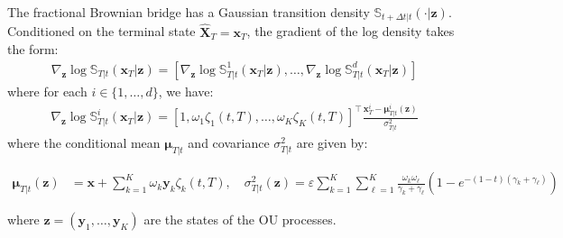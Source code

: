 \documentclass{article}
\begin{document}
\begin{lemma}\label{lemma:frac-gaus-bridge}
    The fractional Brownian bridge has a Gaussian transition density $\mathbb{S}_{t+\Delta t|t}(\cdot|\boldsymbol{z})$. Conditioned on the terminal state $\widehat{\boldsymbol{X}}_T=\boldsymbol{x}_T$, the gradient of the log density takes the form:
    \begin{align}
        \nabla_{\boldsymbol{z}}\log \mathbb{S}_{T|t}(\boldsymbol{x}_T|\boldsymbol{z})=\left[\nabla_{\boldsymbol{z}}\log \mathbb{S}^1_{T|t}(\boldsymbol{x}_T|\boldsymbol{z}), \dots, \nabla_{\boldsymbol{z}}\log \mathbb{S}^d_{T|t}(\boldsymbol{x}_T|\boldsymbol{z})\right]
    \end{align}
    where for each $i\in \{1, \dots, d\}$, we have:
    \begin{align}
        \nabla_{\boldsymbol{z}}\log\mathbb{S}^i_{T|t}(\boldsymbol{x}_T|\boldsymbol{z})=[1, \omega_1\zeta_1(t,T), \dots, \omega_K\zeta_K(t, T)]^\top\frac{\boldsymbol{x}^i_T-\boldsymbol{\mu}^i_{T|t}(\boldsymbol{z})}{\sigma^2_{T|t}}
    \end{align}
    where the conditional mean $\boldsymbol{\mu}_{T|t}$ and covariance $\sigma^2_{T|t}$ are given by:
    \begin{small}
    \begin{align}
        \boldsymbol{\mu}_{T|t}(\boldsymbol{z})&=\boldsymbol{x}+\sum_{k=1}^K\omega_k\boldsymbol{y}_k\zeta_k(t,T),\quad \sigma_{T|t}^2(\boldsymbol{z})=\varepsilon\sum_{k=1}^K\sum_{\ell=1}^K\frac{\omega_k\omega_\ell}{\gamma_k+\gamma_\ell}\left(1-e^{-(1-t)(\gamma_k+\gamma_\ell)}\right)
    \end{align}
    \end{small}
    where $\boldsymbol{z}=(\boldsymbol{y}_1, \dots, \boldsymbol{y}_K)$ are the states of the OU processes.
\end{lemma}
\end{document}

